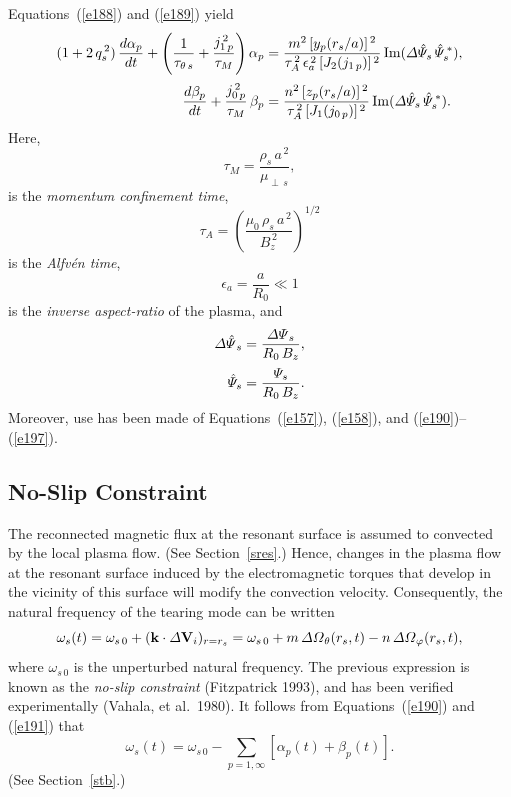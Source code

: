 \documentclass[notitlepage,12pt]{article}
\begin{document}
Equations~(\ref{e188}) and (\ref{e189}) yield
\begin{align}\label{e198}
(1+2\,q_s^{\,2})\,\frac{d\alpha_p}{dt} + \left(\frac{1}{\tau_{\theta\,s}}+\frac{j_{1\,p}^{\,2}}{\tau_{M}}\right)\alpha_p
&= \frac{m^{2}\,[y_p(r_s/a)]^{\,2}}{\tau_A^{\,2}\,\epsilon_a^{\,2}\,[J_2(j_{1\,p})]^{\,2}}\,
{\rm Im}({\mit\Delta\hat{\Psi}_s}\,\hat{\mit\Psi}_s^{\,\ast}),\\[0.5ex]
\frac{d\beta_p}{dt} + \frac{j_{0\,p}^{\,2}}{\tau_{M}}\,\beta_p
&= \frac{n^{2}\,[z_p(r_s/a)]^{\,2}}{\tau_A^{\,2}\,[J_1(j_{0\,p})]^{\,2}}\,
{\rm Im}({\mit\Delta\hat{\Psi}_s}\,\hat{\mit\Psi}_s^{\,\ast}).\label{e199}
\end{align}
Here, 
\begin{equation}
\tau_{M} =\frac{\rho_s\,a^{\,2}}{\mu_{\perp\,s}},
\end{equation} 
is the {\em momentum confinement time}, 
\begin{equation}
\tau_A = \left(\frac{\mu_0\,\rho_s\,a^{\,2}}{B_z^{\,2}}\right)^{1/2}
\end{equation}
 is the {\em Alfv\'{e}n time}, 
 \begin{equation}
 \epsilon_a=\frac{a}{R_0}\ll 1
 \end{equation}
 is the {\em inverse aspect-ratio}\/ of the plasma, and
 \begin{align}
{\mit\Delta\hat{\Psi}}_s &=\frac{{\mit\Delta\Psi}_s}{R_0\,B_z},\label{e204}\\[0.5ex]
 \hat{\mit\Psi}_s &=\frac{{\mit\Psi}_s}{R_0\,B_z}.
 \end{align}
  Moreover,
use has been made of Equations~(\ref{e157}), (\ref{e158}), and (\ref{e190})--(\ref{e197}). 

\subsection{No-Slip Constraint}\label{sns}
The reconnected magnetic flux at the resonant surface is assumed to convected by the local plasma flow. (See Section~\ref{sres}.) Hence, changes in the
plasma flow at the resonant surface induced by the electromagnetic torques that develop in the vicinity of this
surface will modify the convection velocity. Consequently, the natural frequency of the tearing mode can be written
\begin{equation}\label{e200}
 \omega_s(t) = \omega_{s\,0} + ({\bf k}\cdot {\mit\Delta}{\bf V}_i)_{r=r_s}=
 \omega_{s\,0} + m\,{\mit\Delta\Omega}_\theta(r_s,t) - n\,{\mit\Delta\Omega}_\varphi(r_s,t),
\end{equation}
where $\omega_{s\,0}$ is the unperturbed natural frequency. The previous expression is known as the {\em no-slip constraint}\/ (Fitzpatrick 1993), and has been verified experimentally (Vahala, et al.\ 1980). 
It follows from Equations~(\ref{e190})
and (\ref{e191}) that
\begin{equation}\label{e201}
\omega_s(t) = \omega_{s\,0} - \sum_{p=1,\infty}\left[\alpha_p(t)+\beta_p(t)\right].
\end{equation}
(See Section~\ref{stb}.)
\end{document}
